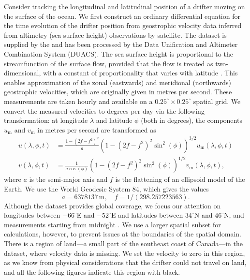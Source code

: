 Consider tracking the longitudinal and latitudinal position of a drifter moving on the surface of the ocean.
We first construct an ordinary differential equation for the time evolution of the drifter position from geostrophic velocity data inferred from altimetry (sea surface height) observations by satellite.
The dataset is supplied by the \citet{E.U.CopernicusMarineServiceCMEMS_2020_GlobalOceanGridded} and has been processed by the Data Unification and Altimeter Combination System (DUACS).
The sea surface height is proportional to the streamfunction of the surface flow, provided that the flow is treated as two-dimensional, with a constant of proportionality that varies with latitude \citep{Park_2004_DeterminationSurfaceGeostrophic,DoglioniEtAl_2021_SeaSurfaceHeight}.
This enables approximation of the zonal (eastwards) and meridional (northwards) geostrophic velocities, which are originally given in metres per second.
These measurements are taken hourly and available on a \(0.25^\circ \times 0.25^\circ\) spatial grid.
We convert the measured velocities to degrees per day via the following transformation: at longitude \(\lambda\) and latitude \(\phi\) (both in degrees), the components \(u_{\mathrm{m}}\) and \(v_{\mathrm{m}}\) in metres per second are transformed as \citep{Capderou_2014_HandbookSatelliteOrbits}
\begin{subequations}\label{eqn:natl_vel_conv}
	\begin{align}
		u\!\left(\lambda, \phi, t\right) & = \frac{1 - \left(2f - f^2\right)^2}{a}\left(1 - \left(2f - f^2\right)^2\sin^2\!\left(\phi\right)\right)^{3/2} u_{\mathrm{m}}\!\left(\lambda, \phi, t\right) \\
		v\!\left(\lambda, \phi, t\right) & = \frac{1}{a\cos\!\left(\phi\right)}\left(1 - \left(2f - f^2\right)^2\sin^2\!\left(\phi\right)\right)^{1/2} v_{\mathrm{m}}\!\left(\lambda, \phi, t\right),
	\end{align}
\end{subequations}
where \(a\) is the semi-major axis and \(f\) is the flattening of an ellipsoid model of the Earth.
We use the World Geodesic System 84, which gives the values \citep{Capderou_2014_HandbookSatelliteOrbits}
\[
	a = 6378137\,\unit{\metre}, \quad f = 1 / (298.257223563).
\]
Although the dataset provides global coverage, we focus our attention on longitudes between \(-66^\circ\)E and \(-52^\circ\)E and latitudes between \(34^\circ\)N and \(46^\circ\)N, and measurements starting from midnight .
We use a larger spatial subset for calculations, however, to prevent issues at the boundaries of the spatial domain.
There is a region of land---a small part of the southeast coast of Canada---in the dataset, where velocity data is missing.
We set the velocity to zero in this region, as we know from physical considerations that the drifter could not travel on land, and all the following figures indicate this region with black.

